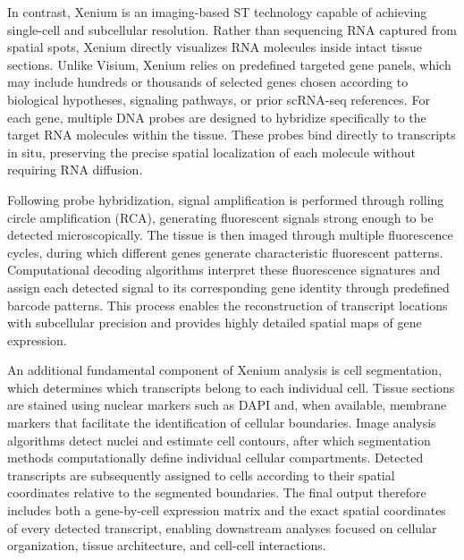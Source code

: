 In contrast, Xenium is an imaging-based ST technology capable of achieving single-cell and subcellular resolution. Rather than sequencing RNA captured from spatial spots, Xenium directly visualizes RNA molecules inside intact tissue sections. Unlike Visium, Xenium relies on predefined targeted gene panels, which may include hundreds or thousands of selected genes chosen according to biological hypotheses, signaling pathways, or prior scRNA-seq references. For each gene, multiple DNA probes are designed to hybridize specifically to the target RNA molecules within the tissue. These probes bind directly to transcripts in situ, preserving the precise spatial localization of each molecule without requiring RNA diffusion.

Following probe hybridization, signal amplification is performed through rolling circle amplification (RCA), generating fluorescent signals strong enough to be detected microscopically. The tissue is then imaged through multiple fluorescence cycles, during which different genes generate characteristic fluorescent patterns. Computational decoding algorithms interpret these fluorescence signatures and assign each detected signal to its corresponding gene identity through predefined barcode patterns. This process enables the reconstruction of transcript locations with subcellular precision and provides highly detailed spatial maps of gene expression.

An additional fundamental component of Xenium analysis is cell segmentation, which determines which transcripts belong to each individual cell. Tissue sections are stained using nuclear markers such as DAPI and, when available, membrane markers that facilitate the identification of cellular boundaries. Image analysis algorithms detect nuclei and estimate cell contours, after which segmentation methods computationally define individual cellular compartments. Detected transcripts are subsequently assigned to cells according to their spatial coordinates relative to the segmented boundaries. The final output therefore includes both a gene-by-cell expression matrix and the exact spatial coordinates of every detected transcript, enabling downstream analyses focused on cellular organization, tissue architecture, and cell-cell interactions.

